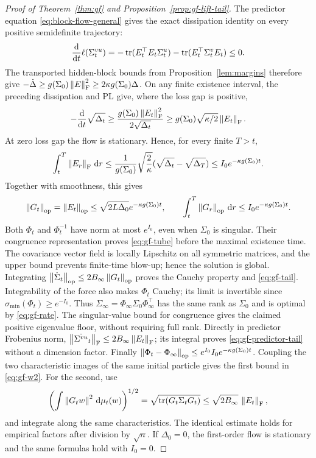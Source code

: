 \begin{proof}[Proof of Theorem~\ref{thm:gf} and Proposition~\ref{prop:gf-lift-tail}]
The predictor equation \eqref{eq:block-flow-general} gives the exact
dissipation identity on every positive semidefinite trajectory:
\begin{equation}\label{eq:flow-dissipation}
\frac{\mathrm{d}}{\mathrm{d}t}\ell(\Sigma^{vu}_t)
=-\operatorname{tr}(E_t^\top E_t\Sigma^u_t)-\operatorname{tr}(E_t^\top\Sigma^v_tE_t)\le0.
\end{equation}
The transported hidden-block bounds from Proposition~\ref{lem:margins}
therefore give $-\dot\Delta\ge g(\Sigma_0)\left\lVert E \right\rVert_{\mathrm{F}}^2\ge2\kappa g(\Sigma_0)\Delta$.
On any finite existence interval, the preceding dissipation and PL give,
where the loss gap is positive,
\[
 -\frac{\mathrm{d}}{\mathrm{d} t}\sqrt{\Delta_t}
 \ge\frac{g(\Sigma_0)\left\lVert E_t \right\rVert_{\mathrm{F}}^2}{2\sqrt{\Delta_t}}
 \ge g(\Sigma_0)\sqrt{\kappa/2}\left\lVert E_t \right\rVert_{\mathrm{F}}.
\]
At zero loss gap the flow is stationary. Hence, for every finite $T>t$,
\[
 \int_t^T\left\lVert E_r \right\rVert_{\mathrm{F}}\,\mathrm{d} r
 \le\frac1{g(\Sigma_0)}\sqrt{\frac2\kappa}
       (\sqrt{\Delta_t}-\sqrt{\Delta_T})
 \le I_0e^{-\kappa g(\Sigma_0)t}.
\]
Together with smoothness, this gives
\begin{equation}\label{eq:force-tail}
 \left\lVert G_t \right\rVert_{\mathrm{op}}=\left\lVert E_t \right\rVert_{\mathrm{op}}
 \le\sqrt{2L\Delta_0}e^{-\kappa g(\Sigma_0)t},\qquad
 \int_t^T\left\lVert G_r \right\rVert_{\mathrm{op}}\,\mathrm{d} r\le I_0e^{-\kappa g(\Sigma_0)t}.
\end{equation}
Both $\Phi_t$ and $\Phi_t^{-1}$ have norm at most $e^{I_0}$, even when
$\Sigma_0$ is singular. Their congruence representation proves
\eqref{eq:gf-tube} before the maximal existence time. The covariance vector
field is locally Lipschitz on all symmetric matrices, and the upper bound
prevents finite-time blow-up; hence the solution is global.
Integrating $\left\lVert \dot\Sigma_t \right\rVert_{\mathrm{op}}\le2B_\infty\left\lVert G_t \right\rVert_{\mathrm{op}}$
proves the Cauchy property and \eqref{eq:gf-tail}. Integrability of the
force also makes $\Phi_t$ Cauchy; its limit is invertible since
$\sigma_{\min}(\Phi_t)\ge e^{-I_0}$.
Thus $\Sigma_\infty=\Phi_\infty\Sigma_0\Phi_\infty^\top$ has the same
rank as $\Sigma_0$ and is optimal by \eqref{eq:gf-rate}.
The singular-value bound for congruence gives the claimed positive
eigenvalue floor, without requiring full rank.
Directly in predictor Frobenius norm,
$\left\lVert \dot{\Sigma^{vu}}_t \right\rVert_{\mathrm{F}}\le2B_\infty\left\lVert E_t \right\rVert_{\mathrm{F}}$;
its integral proves \eqref{eq:gf-predictor-tail} without a dimension factor.
Finally $\left\lVert \Phi_t-\Phi_\infty \right\rVert_{\mathrm{op}}\le e^{I_0}I_0e^{-\kappa g(\Sigma_0)t}$.
Coupling the two characteristic images of the same initial particle gives
the first bound in \eqref{eq:gf-w2}. For the second, use
\[
 \left(\int\left\lVert G_t w \right\rVert^2\,\mathrm{d}\mu_t(w)\right)^{1/2}
 =\sqrt{\operatorname{tr}(G_t\Sigma_tG_t)}
 \le\sqrt{2B_\infty}\,\left\lVert E_t \right\rVert_{\mathrm{F}},
\]
and integrate along the same characteristics. The identical estimate
holds for empirical factors after division by $\sqrt n$.
If $\Delta_0=0$, the first-order flow is stationary and
the same formulas hold with $I_0=0$.
\end{proof}
